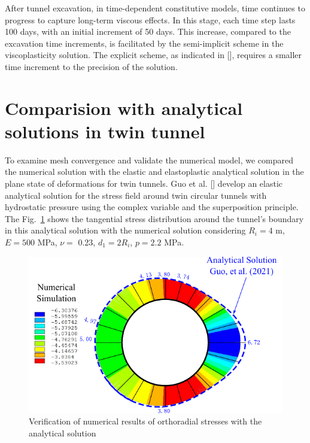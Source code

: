 \documentclass[a4paper,fleqn]{cas-sc}
\begin{document}
After tunnel excavation, in time-dependent constitutive models, time continues to progress to capture long-term viscous effects. In this stage, each time step lasts 100 days, with an initial increment of 50 days. This increase, compared to the excavation time increments, is facilitated by the semi-implicit scheme in the viscoplasticity solution. The explicit scheme, as indicated in [], requires a smaller time increment to the precision of the solution.


\section{Comparision with analytical solutions in twin tunnel}\label{}

To examine mesh convergence and validate the numerical model, we compared the numerical solution with the elastic and elastoplastic analytical solution in the plane state of deformations for twin tunnels. Guo et al. [] develop an elastic analytical solution for the stress field around twin circular tunnels with hydrostatic pressure using the complex variable and the superposition principle. The Fig.~\ref{GUO_FIG1} shows the tangential stress distribution around the tunnel's boundary in this analytical solution with the numerical solution considering  $R_i = 4$ m, $E = 500$ MPa, $\nu =$ 0.23, $d_1 = 2R_i$, $p = 2.2$ MPa.

\begin{figure}[h!]
	\centering
	\includegraphics[scale=1]{GUO_FIG1.pdf}
	\caption{Verification of numerical results of orthoradial stresses with the analytical solution}
	\label{GUO_FIG1}
\end{figure}
\FloatBarrier
\end{document}
